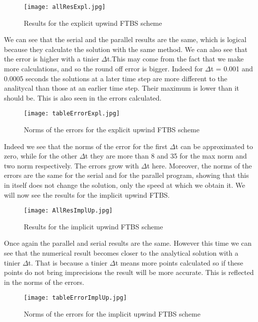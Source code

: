\documentclass [10 pt, a4 paper]{report}
\begin{document}
\clearpage

\begin{figure}[!htbp]
\centering
\texttt{[image: allResExpl.jpg]}
\caption{\label{fig:image} Results for the explicit upwind FTBS scheme}
\end{figure}

\noindent
We can see that the serial and the parallel results are the same, which is logical because they calculate the solution with the same method. We can also see that the error is higher with a tinier $\Delta$t.This may come from the fact that we make more calculations, and so the round off error is bigger. Indeed for $\Delta$t = 0.001 and 0.0005 seconds the solutions at a later time step are more different to the analitycal than those at an earlier time step. Their maximum is lower than it should be. This is also seen in the errors calculated.

\begin{figure}[!htbp]
\centering
\texttt{[image: tableErrorExpl.jpg]}
\caption{\label{fig:image} Norms of the errors for the explicit upwind FTBS scheme}
\end{figure}

\noindent
Indeed we see that the norms of the error for the first $\Delta$t can be approximated to zero, while for the other $\Delta$t they are more than 8 and 35 for the max norm and two norm respectively. The errors grow with $\Delta$t here. Moreover, the norms of the errors are the same for the serial and for the parallel program, showing that this in itself does not change the solution, only the speed at which we obtain it. We will now see the results for the implicit upwind FTBS.

\begin{figure}[!htbp]
\centering
\texttt{[image: AllResImplUp.jpg]}
\caption{\label{fig:image} Results for the implicit upwind FTBS scheme}
\end{figure}

\noindent
Once again the parallel and serial results are the same. However this time we can see that the numerical result becomes closer to the analytical solution with a tinier $\Delta$t. That is because a tinier $\Delta$t means more points calculated so if these points do not bring imprecisions the result will be more accurate. This is reflected in the norms of the errors.

\begin{figure}[!htbp]
\centering
\texttt{[image: tableErrorImplUp.jpg]}
\caption{\label{fig:image} Norms of the errors for the implicit upwind FTBS scheme}
\end{figure}
\end{document}
